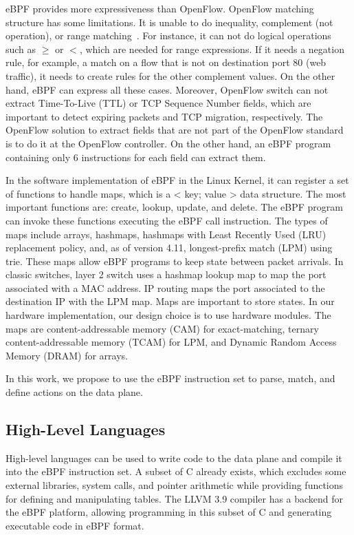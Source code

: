 eBPF provides more expressiveness than OpenFlow.
OpenFlow matching structure has some limitations.
It is unable to do inequality, complement (not operation), or range matching~\cite{Jouet2015OpenFlow}. 
For instance, it can not do logical operations such as $\geq$ or $<$, which are needed for range expressions. 
If it needs a negation rule, for example, a match on a flow that is not on destination port 80 (web traffic), it needs to create rules for the other complement values. 
On the other hand, eBPF can express all these cases.
Moreover, OpenFlow switch can not extract Time-To-Live (TTL) or TCP Sequence Number fields, which are important to detect expiring packets and TCP migration, respectively. 
The OpenFlow solution to extract fields that are not part of the OpenFlow standard is to do it at the OpenFlow controller. 
On the other hand, an eBPF program containing only 6 instructions for each field can extract them.



In the software implementation of eBPF in the Linux Kernel, it can register a set of functions to handle maps, which is a < key; value > data structure. 
The most important functions are: create, lookup, update, and delete.
The eBPF program can invoke these functions executing the eBPF call instruction.
The types of maps include arrays, hashmaps, hashmaps with Least Recently Used (LRU) replacement policy, and, as of version 4.11, longest-prefix match (LPM) using trie.
These maps allow eBPF programs to keep state between packet arrivals.
In classic switches, layer 2 switch uses a hashmap lookup map to map the port associated with a MAC address.
IP routing maps the port associated to the destination IP with the LPM map.
Maps are important to store states.
In our hardware implementation, our design choice is to use hardware modules. The maps are content-addressable memory (CAM) for exact-matching, ternary content-addressable memory (TCAM) for LPM, and Dynamic Random Access Memory (DRAM) for arrays.


In this work, we propose to use the eBPF instruction set to parse, match, and define actions on the data plane.

\subsection{High-Level Languages}


High-level languages can be used to write code to the data plane and compile it into the eBPF instruction set. A subset of C already exists, which excludes some external libraries, system calls, and pointer arithmetic while providing functions for defining and manipulating tables. The LLVM 3.9 compiler has a backend for the eBPF platform, allowing programming in this subset of C and generating executable code in eBPF format.

